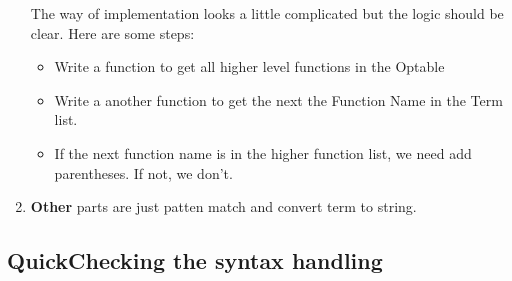 \documentclass[11pt]{article}
\begin{document}
\begin{enumerate}
The way of implementation looks a little complicated but the logic should be clear. Here are some steps:
\begin{itemize}
\item Write a function to get all higher level functions in the Optable
\item Write a another function to get the next the Function Name in the Term list. 
\item If the next function name is in the higher function list, we need add parentheses. If not, we don't.  
\end{itemize}

\item \textbf{Other} parts are just patten match and convert term to string. 

\end{enumerate}

\subsection{QuickChecking the syntax handling}
\end{document}

